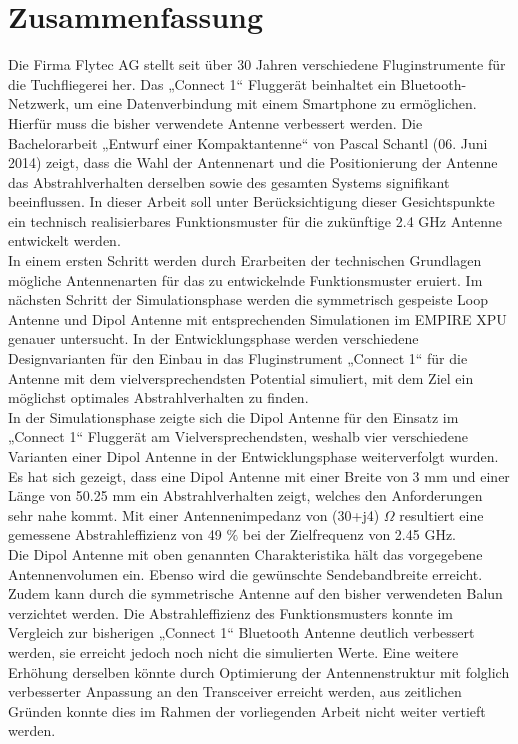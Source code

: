 \newpage
\section*{Zusammenfassung}

Die Firma Flytec AG stellt seit über 30 Jahren verschiedene Fluginstrumente für die Tuchfliegerei her. Das „Connect 1“ Fluggerät beinhaltet ein Bluetooth-Netzwerk, um eine Datenverbindung mit einem Smartphone zu ermöglichen. Hierfür muss die bisher verwendete Antenne verbessert werden. Die Bachelorarbeit „Entwurf einer Kompaktantenne“ von Pascal Schantl (06. Juni 2014) zeigt, dass die Wahl der Antennenart und die Positionierung der Antenne das Abstrahlverhalten derselben sowie des gesamten Systems signifikant beeinflussen. In dieser Arbeit soll unter Berücksichtigung dieser Gesichtspunkte ein technisch realisierbares Funktionsmuster für die zukünftige 2.4 GHz Antenne entwickelt werden.\\ 
In einem ersten Schritt werden durch Erarbeiten der technischen Grundlagen mögliche Antennenarten für das zu entwickelnde Funktionsmuster eruiert. Im nächsten Schritt der Simulationsphase werden die symmetrisch gespeiste Loop Antenne und Dipol Antenne mit entsprechenden Simulationen im EMPIRE XPU genauer untersucht. In der Entwicklungsphase werden verschiedene Designvarianten für den Einbau in das Fluginstrument „Connect 1“ für die Antenne mit dem vielversprechendsten Potential simuliert, mit dem Ziel ein möglichst optimales Abstrahlverhalten zu finden.\\ 
In der Simulationsphase zeigte sich die Dipol Antenne für den Einsatz im „Connect 1“ Fluggerät am Vielversprechendsten, weshalb vier verschiedene Varianten einer Dipol Antenne in der Entwicklungsphase weiterverfolgt wurden. Es hat sich gezeigt, dass eine Dipol Antenne mit einer Breite von 3 mm und einer Länge von 50.25 mm ein Abstrahlverhalten zeigt, welches den Anforderungen sehr nahe kommt. Mit einer Antennenimpedanz von (30+j4) $\Omega$ resultiert eine gemessene Abstrahleffizienz von 49 $\%$ bei der  Zielfrequenz von 2.45 GHz.\\
Die Dipol Antenne mit oben genannten Charakteristika hält das vorgegebene Antennenvolumen ein. Ebenso wird die gewünschte Sendebandbreite erreicht. Zudem kann durch die symmetrische Antenne auf den bisher verwendeten Balun verzichtet werden. Die Abstrahleffizienz des Funktionsmusters konnte im Vergleich zur bisherigen „Connect 1“ Bluetooth Antenne deutlich verbessert werden, sie erreicht jedoch noch nicht die simulierten Werte. Eine weitere Erhöhung derselben könnte durch Optimierung der Antennenstruktur mit folglich verbesserter Anpassung an den Transceiver erreicht werden, aus zeitlichen Gründen konnte dies im Rahmen der vorliegenden Arbeit nicht weiter vertieft werden.





